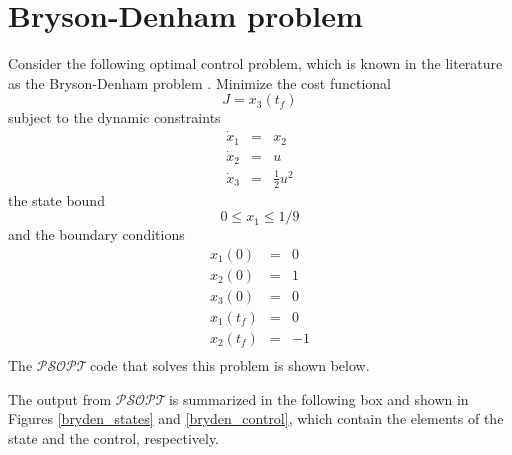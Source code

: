 \documentclass[a4paper,11pt]{report}    %
\newcommand{\psopt}{$\mathcal{PSOPT}$\,}  %
\newenvironment{shadedframe}{%
  \def\FrameCommand{\fcolorbox{black}{shadecolor}}%
  \MakeFramed {\FrameRestore}}
{\endMakeFramed}
\begin{document}
\section{Bryson-Denham problem}

Consider the following optimal control problem, which is known in the literature
as the Bryson-Denham problem \cite{Bryson:69}.  Minimize the cost functional
\begin{equation}
  J = x_3(t_f)
\end{equation}
subject to the dynamic constraints
\begin{equation}
  \begin{array}{lcl}
    \dot x_1 & = & x_2 \\
    \dot x_2 & = & u \\
    \dot x_3 & = & \frac{1}{2} u^2 
  \end{array}
\end{equation}
the state bound
\begin{equation}
    0 \le  x_1 \le 1/9
\end{equation}
and the boundary conditions
\begin{equation}
  \begin{array}{lcl}
    x_1(0) & = & 0 \\
    x_2(0) & = & 1 \\
    x_3(0) & = & 0 \\
    x_1(t_f) & = & 0 \\
    x_2(t_f) & = & -1 \\
  \end{array}
\end{equation}
The
\psopt code that solves this problem is shown below.  


\tiny
\begin{shadedframe}

\end{shadedframe}
\normalsize

The output from \psopt is summarized in  the following box and shown in Figures \ref{bryden_states} and \ref{bryden_control}, which contain the elements of the state and the control, respectively.

\begin{shadedframe}

\end{shadedframe}
\end{document}
